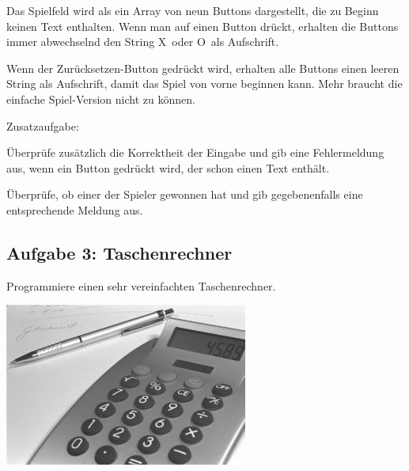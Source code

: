 Das Spielfeld wird als ein Array von neun Buttons dargestellt, die zu Beginn
keinen Text enthalten. Wenn man auf einen Button drückt, erhalten die Buttons
immer abwechselnd den String \glqq X\grqq\ oder \glqq O\grqq\ als Aufschrift.

Wenn der Zurücksetzen-Button gedrückt wird, erhalten alle Buttons einen leeren
String als Aufschrift, damit das Spiel von vorne beginnen kann. Mehr braucht
die einfache Spiel-Version nicht zu können.

Zusatzaufgabe:

\begin{compactenum}[a)]
\item Überprüfe zusätzlich die Korrektheit der Eingabe und gib eine
Fehlermeldung aus, wenn ein Button gedrückt wird, der schon einen Text enthält.

\item Überprüfe, ob einer der Spieler gewonnen hat und gib gegebenenfalls eine
entsprechende Meldung aus.
\end{compactenum}


\subsection{Aufgabe 3: Taschenrechner}

Programmiere einen sehr vereinfachten Taschenrechner.

\begin{center}
\includegraphics[width=0.6\textwidth]{./inf/SEKII/24_Java_GUI-Komponenten/Taschenrechner.png}
\end{center}

